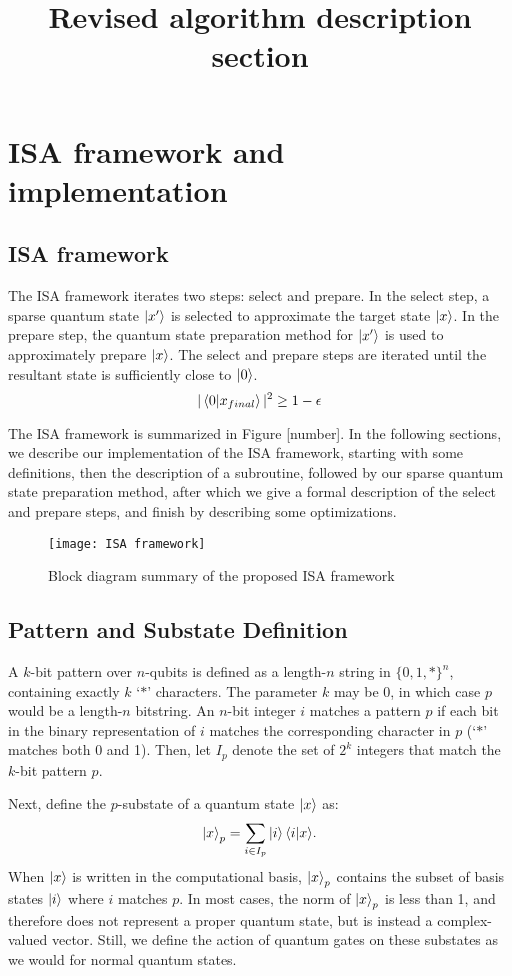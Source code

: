 \documentclass{article}
\begin{document}
\title{Revised algorithm description section}
\maketitle

\section{ISA framework and implementation}
\subsection{ISA framework}
The ISA framework iterates two steps: select and prepare. In the select step, a
sparse quantum state $\mathinner{|{x'}\rangle}$ is selected to approximate the target state
$\mathinner{|{x}\rangle}$. In the prepare step, the quantum state preparation method for
$\mathinner{|{x'}\rangle}$ is used to approximately prepare $\mathinner{|{x}\rangle}$. The select and prepare
steps are iterated until the resultant state is sufficiently close to 
$\mathinner{|{0}\rangle}$.
$$|\mathinner{\langle{0|x_{final}}\rangle}|^2 \geq 1 - \epsilon$$

The ISA framework is summarized in Figure [number]. In the following sections, we describe our implementation of the ISA framework,
starting with some definitions, then the description of a subroutine, followed
by our sparse quantum state preparation method, after which we give a formal 
description of the select and prepare steps, and finish by describing some 
optimizations.

\begin{figure}[H]
\centering
\texttt{[image: ISA framework]}
\caption{Block diagram summary of the proposed ISA framework}
\end{figure}

\subsection{Pattern and Substate Definition}
A $k$-bit pattern over $n$-qubits is defined as a length-$n$ string in 
$\{0, 1, *\}^n$, containing exactly $k$ `$*$' characters. The parameter $k$ may
be 0, in which case $p$ would be a length-$n$ bitstring. An $n$-bit integer $i$
matches a pattern $p$ if each bit in the binary representation of $i$
matches the corresponding character in $p$ (`$*$' matches both 0 and 1). Then,
let $I_p$ denote the set of $2^k$ integers that match the $k$-bit pattern $p$.

Next, define the $p$-substate of a quantum state $\mathinner{|{x}\rangle}$ as:
$$\mathinner{|{x}\rangle}_p = \sum_{i \in I_p}{\mathinner{|{i}\rangle}\mathinner{\langle{i|x}\rangle}}.$$
When $\mathinner{|{x}\rangle}$ is written in the computational basis, $\mathinner{|{x}\rangle}_p$ contains the
subset of basis states $\mathinner{|{i}\rangle}$ where $i$ matches $p$. In most cases, 
the norm of $\mathinner{|{x}\rangle}_p$ is less than 1, and therefore does not represent a
proper quantum state, but is instead a complex-valued vector. Still, we define
the action of quantum gates on these substates as we would for normal quantum
states.
\end{document}
